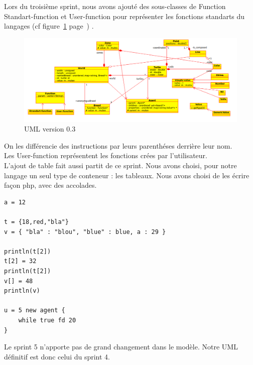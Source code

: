 Lors du troisième sprint, nous avons ajouté des sous-classes de Function Standart-function et User-function pour représenter les fonctions standarts du langages (cf figure~\ref{v0.3} page~\pageref{v0.3}) .
\begin{figure}[h]
\caption{\label{v0.3} UML version 0.3}
\includegraphics[scale=0.4]{doc/report/uml/v03.png}
\end{figure}
On les différencie des instructions par leurs parenthéses derrière leur nom.\\ Les User-function représentent les fonctions crées par l'utilisateur.\\
L'ajout de table fait aussi partit de ce sprint. Nous avons choisi, pour notre langage un seul type de conteneur : les tableaux.
Nous avons choisi de les écrire façon php, avec des accolades.\\
\begin{lstlisting}
a = 12

t = {18,red,"bla"}
v = { "bla" : "blou", "blue" : blue, a : 29 }

println(t[2])
t[2] = 32
println(t[2])
v[] = 48
println(v)

u = 5 new agent {
	while true fd 20
}
\end{lstlisting}
Le sprint 5 n'apporte pas de grand changement dans le modèle. Notre UML définitif est donc celui du sprint 4.

